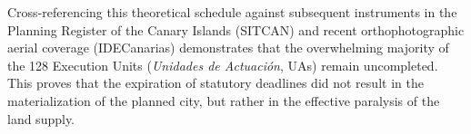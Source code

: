 





Cross-referencing this theoretical schedule against subsequent instruments in the Planning Register of the Canary Islands (SITCAN) and recent orthophotographic aerial coverage (IDECanarias) demonstrates that the overwhelming majority of the 128 Execution Units (\emph{Unidades de Actuación}, UAs) remain uncompleted. This proves that the expiration of statutory deadlines did not result in the materialization of the planned city, but rather in the effective paralysis of the land supply.
